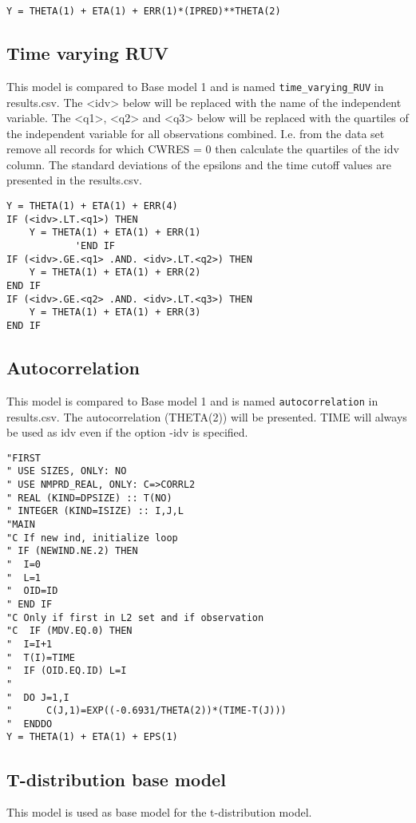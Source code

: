 \begin{verbatim}
Y = THETA(1) + ETA(1) + ERR(1)*(IPRED)**THETA(2)
\end{verbatim}

\subsection{Time varying RUV}
This model is compared to Base model 1 and is named \verb|time_varying_RUV| in results.csv. The <idv> below will be replaced with the name of the independent variable. The <q1>, <q2> and <q3> below will be replaced with the quartiles of the independent variable for all observations combined. I.e. from the data set remove all records for which CWRES = 0 then calculate the quartiles of the idv column. The standard deviations of the epsilons and the time cutoff values are presented in the results.csv.
\begin{verbatim}
Y = THETA(1) + ETA(1) + ERR(4)
IF (<idv>.LT.<q1>) THEN
    Y = THETA(1) + ETA(1) + ERR(1)
            'END IF
IF (<idv>.GE.<q1> .AND. <idv>.LT.<q2>) THEN
    Y = THETA(1) + ETA(1) + ERR(2)
END IF
IF (<idv>.GE.<q2> .AND. <idv>.LT.<q3>) THEN
    Y = THETA(1) + ETA(1) + ERR(3)
END IF
\end{verbatim}

\subsection{Autocorrelation}
This model is compared to Base model 1 and is named \verb|autocorrelation| in results.csv. The autocorrelation (THETA(2)) will be presented. TIME will always be used as idv even if the option -idv is specified.
\begin{verbatim}
"FIRST
" USE SIZES, ONLY: NO
" USE NMPRD_REAL, ONLY: C=>CORRL2
" REAL (KIND=DPSIZE) :: T(NO)
" INTEGER (KIND=ISIZE) :: I,J,L
"MAIN
"C If new ind, initialize loop
" IF (NEWIND.NE.2) THEN
"  I=0
"  L=1
"  OID=ID
" END IF
"C Only if first in L2 set and if observation
"C  IF (MDV.EQ.0) THEN
"  I=I+1
"  T(I)=TIME
"  IF (OID.EQ.ID) L=I
"
"  DO J=1,I
"      C(J,1)=EXP((-0.6931/THETA(2))*(TIME-T(J)))
"  ENDDO
Y = THETA(1) + ETA(1) + EPS(1)
\end{verbatim}
\newpage

\subsection{T-distribution base model}
This model is used as base model for the t-distribution model.

